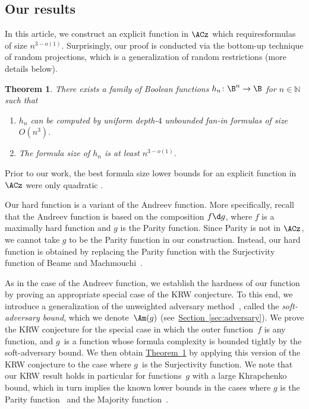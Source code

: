 \documentclass[11pt]{article}
\numberwithin{equation}{section}
\newtheorem{theorem}{Theorem}[section]
\theoremstyle{definition}
\theoremstyle{plain}
\newcommand{\N}{\mathbb N}
\newcommand{\expref}[2]{\hyperref[#2]{#1~\ref{#2}}}
\theoremstyle{definition}\newtheorem{notation}[theorem]{Notation}\theoremstyle{plain}
\begin{document}
\subsection{Our results}

In this %
article,  %
we construct an explicit function in $\ACz$ which requiresformulas of size $n^{3-o(1)}$. Surprisingly, our proof
is conducted via the bottom-up technique of random projections, which
is a generalization of random restrictions (more details below).
\begin{theorem}
\label{thm:main}There exists a family of Boolean functions $h_{n}\colon\B^{n}\to\B$
for $n\in\N$ such that 
\begin{enumerate}
\item $h_{n}$ can be computed by uniform depth-$4$ unbounded fan-in formulas
of size $O(n^{3})$. 
\item The formula size of $h_{n}$ is at least $n^{3-o(1)}$.
\end{enumerate}
\end{theorem}

Prior to our work, the best formula size lower bounds
%
for  %
an explicit
function in $\ACz$ were only quadratic \cite{N66,CKK12,JuknaBook,BM12}.

Our hard function is a variant of the Andreev function. More specifically,
recall that the Andreev function is based on the composition $f\d g$,
where $f$ is a maximally hard function and $g$ is the Parity function.
Since Parity is not in $\ACz$, we cannot take $g$ to be the Parity
function in our construction. Instead, our hard function is obtained
by replacing the Parity function with the Surjectivity function of Beame and Machmouchi~\cite{BM12}.

As in the case of the Andreev function, we establish the hardness
of our function by proving an appropriate special case of the KRW
conjecture. To this end, we introduce a generalization of the unweighted
%
adversary method~\cite{A02}, called the \emph{soft-adversary bound}, which we
denote~$\Am(g)$ (see~\expref{Section}{sec:adversary}). We prove the KRW
conjecture for the special case in which the outer function~$f$
is any function, and $g$~is a function whose formula complexity
is bounded tightly by the soft-adversary bound. We then obtain \expref{Theorem}{thm:main}
by applying this version of the KRW conjecture to the case where $g$~is
the Surjectivity function. We note that our KRW result holds in particular
for functions~$g$ with a large Khrapchenko bound, which in turn
implies the known lower bounds in the cases where $g$ is the Parity
function~\cite{H98} and the Majority function~\cite{GTN19}.
\end{document}
